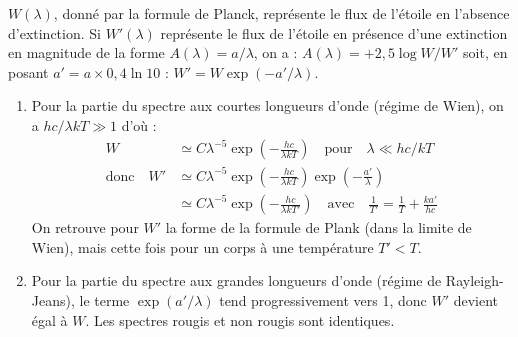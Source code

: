 \documentclass[a4paper,10pt]{report}
\begin{document}
\begin{Answer}
  $W(\lambda)$, donné par la formule de Planck, représente le flux de
  l'étoile en l'absence d'extinction.  Si $W'(\lambda)$ représente le
  flux de l'étoile en présence d'une extinction en magnitude de la
  forme $A(\lambda) = a/\lambda$, on a : $A(\lambda)= +2,5 \log W/W'$
  soit, en posant $a' = a \times 0,4 \ln 10$ : $W' = W
  \exp(-a'/\lambda)$.

  \begin{enumerate}
  \item Pour la partie du spectre aux courtes longueurs d'onde (régime
    de Wien), on a $hc/\lambda kT \gg 1$ d'où :
    \begin{align*}
      W  &\simeq C\lambda^{-5}\exp\left(-\frac{hc}{\lambda kT}\right)
      \quad\text{pour}\quad \lambda \ll hc/kT\\
      \text{donc}\quad
      W' &\simeq C\lambda^{-5}\exp\left(-\frac{hc}{\lambda kT}\right)
      \exp\left(-\frac{a'}{\lambda}\right) \\
      &\simeq C\lambda^{-5}\exp\left(-\frac{hc}{\lambda kT'}\right)
      \quad\text{avec}\quad
      \frac{1}{T'} = \frac{1}{T} + \frac{ka'}{hc}
    \end{align*}
    On retrouve pour $W'$ la forme de la formule de Plank (dans la
    limite de Wien), mais cette fois pour un corps à une température
    $T' < T$.

  \item Pour la partie du spectre aux grandes longueurs d'onde (régime
    de Rayleigh-Jeans), le terme $\exp(a'/\lambda)$ tend
    progressivement vers 1, donc $W'$ devient égal à $W$. Les spectres
    rougis et non rougis sont identiques.
  \end{enumerate}
\end{Answer}
\end{document}
